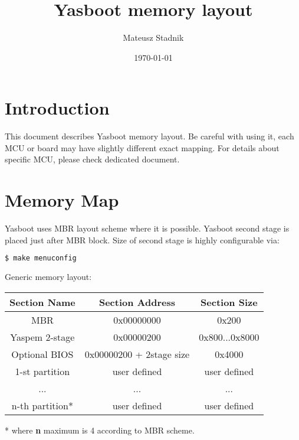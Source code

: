 \documentclass{article}
\title{Yasboot memory layout}
\author{Mateusz Stadnik}
\date{\today}
\newcommand{\memorymap}[3]{
  #1 & #2 & #3 \\
  \hline
}
\begin{document}
\maketitle

\section{Introduction}
This document describes Yasboot memory layout. 
Be careful with using it, each MCU or board may have slightly different exact mapping. 
For details about specific MCU, please check dedicated document. 

\section{Memory Map}
Yasboot uses MBR layout scheme where it is possible. 
Yasboot second stage is placed just after MBR block. 
Size of second stage is highly configurable via: 
\begin{lstlisting}[language=bash]
$ make menuconfig
\end{lstlisting}

\noindent Generic memory layout: 

\begin{tabular}{|c|c|c|}
  \hline
  \rowcolor{gray!50} 
  \memorymap{Section Name}{Section Address}{Section Size} 
  \rowcolor{yellow!20}
  \memorymap{MBR}{0x00000000}{0x200}
  \rowcolor{yellow!20}
  \memorymap{Yaspem 2-stage}{0x00000200}{0x800...0x8000}

  \rowcolor{green!10}
  \memorymap{Optional BIOS}{0x00000200 + 2stage size}{0x4000}
  \rowcolor{blue!5} 
  \memorymap{1-st partition}{user defined}{user defined}
  \rowcolor{blue!5} 
  \memorymap{...}{...}{...}
  \rowcolor{blue!5} 
  \memorymap{n-th partition*}{user defined}{user defined}
\end{tabular}

* where \textbf{n} maximum is 4 according to MBR scheme.
\end{document}

